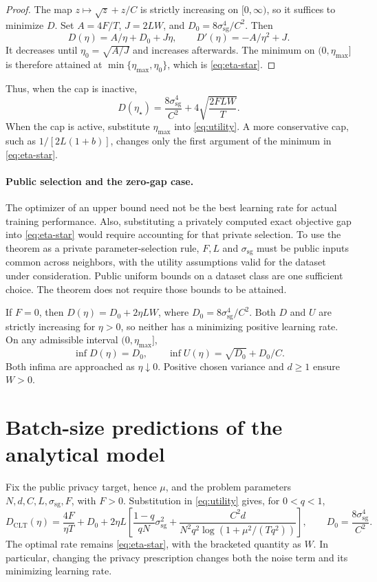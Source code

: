 \documentclass[11pt]{article}
\newcommand{\sg}{\mathrm{sg}}
\begin{document}
\begin{proof}
The map $z\mapsto\sqrt z+z/C$ is strictly increasing on $[0,\infty)$,
so it suffices to minimize $D$. Set $A=4F/T$, $J=2LW$, and
$D_0=8\sigma_{\sg}^4/C^2$. Then
\[
 D(\eta)=A/\eta+D_0+J\eta,\qquad
 D'(\eta)=-A/\eta^2+J.
\]
It decreases until $\eta_0=\sqrt{A/J}$ and increases afterwards.
The minimum on $(0,\eta_{\max}]$ is therefore attained at
$\min\{\eta_{\max},\eta_0\}$, which is \eqref{eq:eta-star}.
\end{proof}

Thus, when the cap is inactive,
\begin{equation}\label{eq:optimal-value}
 D(\eta_\star)=\frac{8\sigma_{\sg}^4}{C^2}
                     +4\sqrt{\frac{2FLW}{T}}.
\end{equation}
When the cap is active, substitute $\eta_{\max}$ into \eqref{eq:utility}.
A more conservative cap, such as $1/[2L(1+b)]$, changes only the first
argument of the minimum in \eqref{eq:eta-star}.

\paragraph{Public selection and the zero-gap case.}
The optimizer of an upper bound need not be the best learning rate for actual
training performance. Also, substituting a privately computed exact objective
gap into \eqref{eq:eta-star} would require accounting for that private selection.
To use the theorem as a private parameter-selection rule, $F,L$ and
$\sigma_{\sg}$ must be public inputs common across neighbors, with the
utility assumptions valid for the dataset under consideration. Public uniform
bounds on a dataset class are one sufficient choice. The theorem does not
require those bounds to be attained.

If $F=0$, then $D(\eta)=D_0+2\eta LW$, where $D_0=8\sigma_{\sg}^4/C^2$.
Both $D$ and $U$ are strictly increasing for $\eta>0$, so neither has a
minimizing positive learning rate. On any admissible interval
$(0,\eta_{\max}]$,
\[
 \inf D(\eta)=D_0,\qquad
 \inf U(\eta)=\sqrt{D_0}+D_0/C.
\]
Both infima are approached as $\eta\downarrow0$. Positive chosen
variance and $d\ge1$ ensure $W>0$.

\section{Batch-size predictions of the analytical model}
\label{sec:clt-batches}
Fix the public privacy target, hence $\mu$, and the problem parameters
$N,d,C,L,\sigma_{\sg},F$, with $F>0$. Substitution in \eqref{eq:utility}
gives, for $0<q<1$,
\begin{equation}\label{eq:clt-D}
 D_{\mathrm{CLT}}(\eta)
 =\frac{4F}{\eta T}+D_0
  +2\eta L\left[\frac{1-q}{qN}\sigma_{\sg}^2+
  \frac{C^2d}{N^2q^2\log(1+\mu^2/(Tq^2))}\right],
 \qquad D_0=\frac{8\sigma_{\sg}^4}{C^2}.
\end{equation}
The optimal rate remains \eqref{eq:eta-star}, with the bracketed quantity
as $W$. In particular, changing the privacy prescription changes both the
noise term and its minimizing learning rate.
\end{document}
